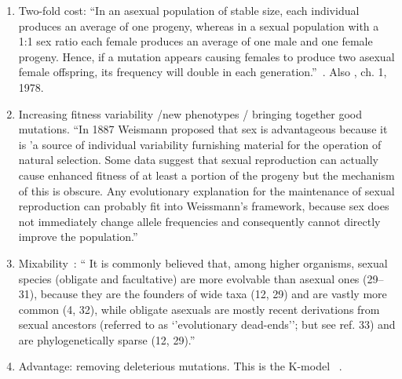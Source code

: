 \begin{enumerate}
    \item Two-fold cost: ``In an asexual population of stable size, each individual produces an average of one progeny, whereas in a  sexual population with a 1:1 sex ratio each female produces an average of one male and one female progeny. Hence, if a mutation appears causing females to produce two asexual female offspring, its frequency will double in each generation.''~\cite{kondrashov_deleterious_1988}. Also \cite{smith1978evolution}, ch. 1, 1978.

    \item Increasing fitness variability /new phenotypes / bringing together good mutations. ``In 1887 Weismann proposed that sex is advantageous because it is 'a source of individual variability furnishing material for  the operation of natural selection. Some data suggest that sexual reproduction can actually cause enhanced fitness of at least a portion of the progeny but the mechanism of this is obscure. Any evolutionary explanation for the maintenance of sexual reproduction can probably fit into Weissmann's framework, because sex does not immediately change allele frequencies and consequently cannot directly improve the population.''~\cite{kondrashov_deleterious_1988}
    
    \item Mixability~\cite{livnat_mixability_2008}: `` It is commonly believed that, among higher organisms, sexual species (obligate and facultative) are more evolvable than asexual ones (29–31), because they are the founders of wide taxa (12, 29) and are vastly more common (4, 32), while obligate asexuals are mostly recent derivations from sexual ancestors (referred to as ‘’evolutionary dead-ends’’; but see ref. 33) and are phylogenetically sparse (12, 29).”
    
    \item Advantage: removing deleterious mutations. This is the K-model ~\cite{kondrashov_deleterious_1988}.


\end{enumerate}


